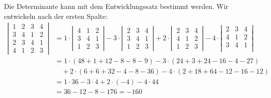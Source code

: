 \begin{loesung}
\begin{teilaufgaben}
\item
Die Determinante kann mit dem Entwicklungssatz bestimmt werden. Wir
entwickeln nach der ersten Spalte:
\begin{align*}
\left|\,
\begin{matrix}
1&2&3&4\\
3&4&1&2\\
2&3&4&1\\
4&1&2&3
\end{matrix}
\,\right|
&=
1\cdot\left|\,
\begin{matrix}
4&1&2\\
3&4&1\\
1&2&3
\end{matrix}
\,\right|
-3\cdot\left|\,
\begin{matrix}
2&3&4\\
3&4&1\\
1&2&3
\end{matrix}
\,\right|
+2\cdot\left|\,
\begin{matrix}
2&3&4\\
4&1&2\\
1&2&3
\end{matrix}
\,\right|
-4\cdot \left|\,
\begin{matrix}
2&3&4\\
4&1&2\\
3&4&1\\
\end{matrix}
\,\right|
\\
&=
1\cdot(48+1+12-8-8-9)
-3\cdot(24+3+24-16-4-27)\\
&\quad+2\cdot(6+6+32-4-8-36)
-4\cdot(2+18+64-12-16-12)
\\
&=1\cdot 36
-3\cdot 4
+2\cdot (-4)
-4\cdot 44
\\
&=
36-12-8-176=-160
\end{align*}



\end{teilaufgaben}
\end{loesung}
